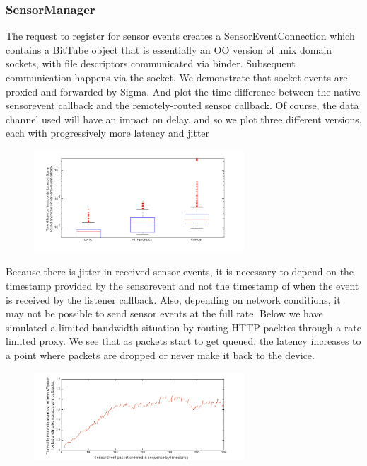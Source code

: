 \documentclass[prodmode]{acmlarge}
\begin{document}
\subsubsection{SensorManager}
The request to register for sensor events creates a SensorEventConnection which contains a BitTube object that is essentially an OO version of unix domain sockets, with file descriptors communicated via binder. Subsequent communication happens via the socket. We demonstrate that socket events are proxied and forwarded by Sigma. And plot the time difference between the native sensorevent callback and the remotely-routed sensor callback. Of course, the data channel used will have an impact on delay, and so we plot three different versions, each with progressively more latency and jitter

\begin{figure}[h]
\centering
\includegraphics[width=0.7\textwidth]{plots/sensorevent_delay.png}
\end{figure}

Because there is jitter in received sensor events, it is necessary to depend on the timestamp provided by the sensorevent and not the timestamp of when the event is received by the listener callback. Also, depending on network conditions, it may not be possible to send sensor events at the full rate. Below we have simulated a limited bandwidth situation by routing HTTP packtes through a rate limited proxy. We see that as packets start to get queued, the latency increases to a point where packets are dropped or never make it back to the device.

\begin{figure}[h]
\centering
\includegraphics[width=0.7\textwidth]{plots/limited_bandwidth_increasing_latency.png}
\end{figure}
\end{document}
